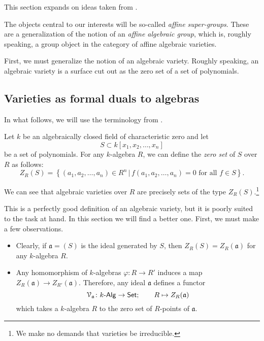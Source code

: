 \documentclass[a4paper,10pt]{scrreprt}
\def\mhyp{{\hbox{-}}}
\theoremstyle{definition}
\theoremstyle{plain}
\theoremstyle{remark}
\begin{document}
This section expands on ideas taken from \cite{milne-affine-group-schemes}.

The objects central to our interests will be so-called \emph{affine super-groups}. These are a generalization of the notion of an \emph{affine algebraic group}, which is, roughly speaking, a group object in the category of affine algebraic varieties.

First, we must generalize the notion of an algebraic variety. Roughly speaking, an algebraic variety is a surface cut out as the zero set of a set of polynomials. 

\subsection{Varieties as formal duals to algebras}
In what follows, we will use the terminology from \cite{milne-affine-group-schemes}.

Let $k$ be an algebraically closed field of characteristic zero and let 
\begin{equation*}
  S \subset k[x_{1}, x_{2}, \ldots, x_{n}] 
\end{equation*}
be a set of polynomials. For any $k$-algebra $R$, we can define the \emph{zero set} of $S$ over $R$ as follows:
\begin{equation*}
  Z_{R}(S) = \left\{ (a_{1}, a_{2}, \ldots, a_{n}) \in R^{n} \,\big|\, f(a_{1}, a_{2}, \ldots, a_{n}) = 0\text{ for all }f \in S \right\}.
\end{equation*}

We can see that algebraic varieties over $R$ are precisely sets of the type $Z_{R}(S)$.\footnote{We make no demands that varieties be irreducible.}

This is a perfectly good definition of an algebraic variety, but it is poorly suited to the task at hand. In this section we will find a better one. First, we must make a few observations.

\begin{itemize}
  \item Clearly, if $\mathfrak{a} = (S)$ is the ideal generated by $S$, then $Z_{R}(S) = Z_{R}(\mathfrak{a})$ for any $k$-algebra $R$. 

  \item Any homomorphism of $k$-algebras $\varphi\colon R \to R'$ induces a map $Z_{R}(\mathfrak{a}) \to Z_{R'}(\mathfrak{a})$. Therefore, any ideal $\mathfrak{a}$ defines a functor 
    \begin{equation*}
      \mathcal{V}_{\mathfrak{a}}\colon k\mhyp\mathsf{Alg} \to \mathsf{Set};\qquad R \mapsto Z_{R}(\mathfrak{a})
    \end{equation*}
    which takes a $k$-algebra $R$ to the zero set of $R$-points of $\mathfrak{a}$.
\end{itemize}
\end{document}
